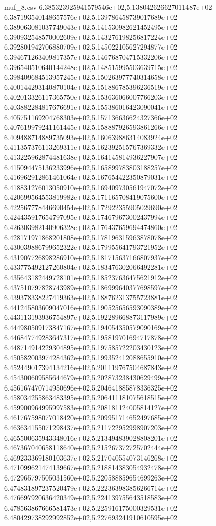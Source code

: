\begin{filecontents*}{muf_8.csv}
6.385323925941579546e+02,5.138042626627011487e+02
6.387193540148657576e+02,5.139786458739017689e+02
6.389063081037749043e+02,5.141530982621452495e+02
6.390932548570002609e+02,5.143276198256817224e+02
6.392801942706880709e+02,5.145022105627294877e+02
6.394671263409817357e+02,5.146768704715332206e+02
6.396540510640144248e+02,5.148515995503639715e+02
6.398409684513957245e+02,5.150263977740314658e+02
6.400144293140870104e+02,5.151886785396236519e+02
6.402013326117365750e+02,5.153636066007766203e+02
6.403882284817676691e+02,5.155386016423090041e+02
6.405751169204768303e+02,5.157136636624327366e+02
6.407619979241161445e+02,5.158887926593861266e+02
6.409488714889735093e+02,5.160639886314083924e+02
6.411357376113269311e+02,5.162392515767369332e+02
6.413225962874481638e+02,5.164145814936227907e+02
6.415094475136233996e+02,5.165899783803188257e+02
6.416962912861461064e+02,5.167654422350879031e+02
6.418831276013050910e+02,5.169409730561947072e+02
6.420699564553819982e+02,5.171165708419075600e+02
6.422567778446690454e+02,5.172922355905029690e+02
6.424435917654797095e+02,5.174679673002437994e+02
6.426303982140906328e+02,5.176437659694474860e+02
6.428171971868201808e+02,5.178196315963878078e+02
6.430039886799652322e+02,5.179955641793721952e+02
6.431907726898286910e+02,5.181715637166807937e+02
6.433775492127260804e+02,5.183476302066492281e+02
6.435643182449728101e+02,5.185237636475621912e+02
6.437510797828743989e+02,5.186999640377698597e+02
6.439378338227419363e+02,5.188762313755723881e+02
6.441245803609047016e+02,5.190525656593090389e+02
6.443113193936754897e+02,5.192289668873117989e+02
6.444980509173847167e+02,5.194054350579090169e+02
6.446847749283647317e+02,5.195819701694717878e+02
6.448714914229304895e+02,5.197585722203430123e+02
6.450582003974284362e+02,5.199352412088655910e+02
6.452449017394134216e+02,5.201119767504687843e+02
6.454300609585644679e+02,5.202873238430629499e+02
6.456167470714950696e+02,5.204641885878336325e+02
6.458034255863483395e+02,5.206411181075618515e+02
6.459900964995997583e+02,5.208181124005814127e+02
6.461767598077018420e+02,5.209951714652497685e+02
6.463634155071298437e+02,5.211722952998907203e+02
6.465500635943348016e+02,5.213494839028808201e+02
6.467367040658118640e+02,5.215267372725702444e+02
6.469233369180103637e+02,5.217040554073146268e+02
6.471099621474139667e+02,5.218814383054932478e+02
6.472965797505031560e+02,5.220588859654699263e+02
6.474831897237520479e+02,5.222363983856266714e+02
6.476697920636420349e+02,5.224139755643518583e+02
6.478563867666581473e+02,5.225916175000329531e+02
6.480429738292992852e+02,5.227693241910610595e+02

\end{filecontents*}
